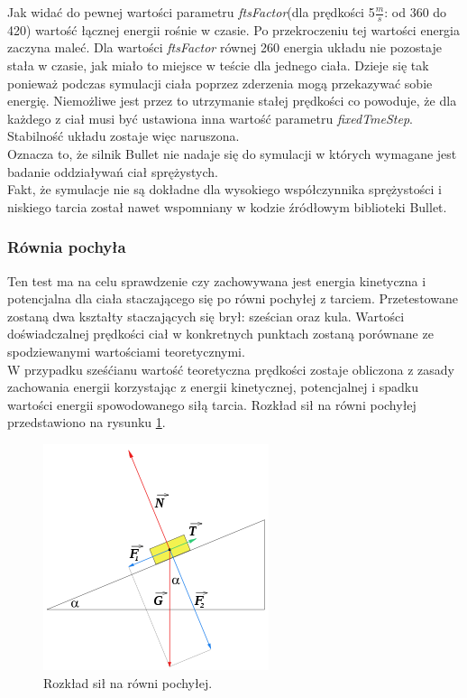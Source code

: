 Jak widać do pewnej wartości parametru \emph{ftsFactor}(dla prędkości 5$
\frac{m}{s} $: od 360 do 420) wartość łącznej energii rośnie w czasie. Po
przekroczeniu tej wartości energia zaczyna maleć. Dla wartości \emph{ftsFactor}
równej 260 energia układu nie pozostaje stała w czasie, jak miało to miejsce w
teście dla jednego ciała. Dzieje się tak ponieważ podczas symulacji ciała
poprzez zderzenia mogą przekazywać sobie energię. Niemożliwe jest przez to
utrzymanie stałej prędkości co powoduje, że dla każdego z ciał musi być
ustawiona inna wartość parametru \emph{fixedTmeStep}. Stabilność układu zostaje
więc naruszona.\\
Oznacza to, że silnik Bullet nie nadaje się do symulacji w których wymagane jest
badanie oddziaływań ciał sprężystych.\\
Fakt, że symulacje nie są dokładne dla wysokiego współczynnika sprężystości i
niskiego tarcia został nawet wspomniany w kodzie źródłowym biblioteki Bullet.




\subsubsection{Równia pochyła}
Ten test ma na celu sprawdzenie czy zachowywana jest energia kinetyczna i
potencjalna dla ciała staczającego się po równi pochyłej z tarciem.
Przetestowane zostaną dwa kształty staczających się brył: sześcian oraz kula.
Wartości doświadczalnej prędkości ciał w konkretnych punktach zostaną porównane
ze spodziewanymi wartościami teoretycznymi.\\
W przypadku sześćianu wartość teoretyczna prędkości zostaje obliczona z zasady
zachowania energii korzystając z energii kinetycznej, potencjalnej i spadku
wartości energii spowodowanego siłą tarcia. Rozkład sił na równi pochyłej
przedstawiono na rysunku \ref{fig:rownia}.

\begin{figure}
\centering
\includegraphics[scale = 0.6]{./img/rownia.PNG}
\caption{Rozkład sił na równi pochyłej.}
\label{fig:rownia}
\end{figure}


